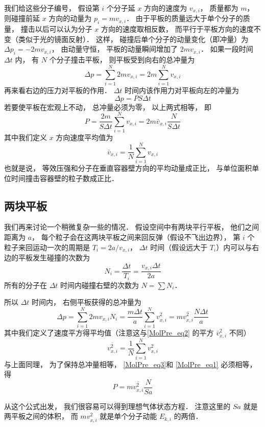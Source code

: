 我们给这些分子编号， 假设第 $i$ 个分子延 $x$ 方向的速度为 $v_{x,i}$， 质量都为 $m$， 则碰撞前延 $x$ 方向的动量为 $p_i = m v_{x,i}$． 由于平板的质量远大于单个分子的质量， 撞击以后可以认为分子 $x$ 方向的速度取相反数， 而平行于平板方向的速度不变（类似于光的镜面反射）． 这样， 碰撞后单个分子的动量变化（即冲量）为 $\Delta p_i = -2mv_{x,i}$， 由动量守恒， 平板的动量瞬间增加了 $2mv_{x,i}$． 如果一段时间 $\Delta t$ 内， 有 $N$ 个分子撞击平板， 则平板受到向右的总冲量为
\begin{equation}
\Delta p = \sum_{i=1}^N 2mv_{x,i} = 2m \sum_{i=1}^N v_{x,i}
\end{equation}
再来看右边的压力对平板的作用． $\Delta t$ 时间内该作用力对平板向左的冲量为
\begin{equation}\label{MolPre_eq1}
\Delta p = PS \Delta t
\end{equation}
若要使平板在宏观上不动， 总冲量必须为零， 以上两式相等， 即
\begin{equation}
P = \frac{2m}{S\Delta t} \sum_{i=1}^N v_{x,i} = 2m\bar v_{x,i} \frac{N}{S\Delta t}
\end{equation}
其中我们定义 $x$ 方向速度平均值为
\begin{equation}\label{MolPre_eq2}
\bar v_{x,i} = \frac{1}{N}\sum_{i=1}^N v_{x,i}
\end{equation}
也就是说， 等效压强和分子在垂直容器壁方向的平均动量成正比， 与单位面积单位时间撞击容器壁的粒子数成正比．

\subsection{两块平板}
我们再来讨论一个稍微复杂一些的情况． 假设空间中有两块平行平板， 他们之间距离为 $a$， 每个粒子会在这两块平板之间来回反弹（假设不飞出边界）， 第 $i$ 个粒子来回运动一次的周期是 $T_i = 2a/v_{x,i}$， $\Delta t$ 时间（假设远大于 $T_i$）内可以与右边的平板发生碰撞的次数为
\begin{equation}
N_i = \frac{\Delta t}{T_i} = \frac{v_{x,i} \Delta t}{2a}
\end{equation}
所有的分子在 $\Delta t$ 时间内碰撞右壁的次数为 $N = \sum N_i$．

所以 $\Delta t$ 时间内， 右侧平板获得的总冲量为
\begin{equation}\label{MolPre_eq3}
\Delta p = \sum_{i=1}^N 2mv_{x,i} N_i = \frac{m \Delta t}{a} \sum_{i=1}^N v_{x,i}^2 = m\overline {v_{x,i}^2} \frac{ N\Delta t}{a}
\end{equation}
其中我们定义了速度平方得平均值（注意这与\autoref{MolPre_eq2} 的平方 $\bar v_{x,i}^2$ 不同）
\begin{equation}
\overline {v_{x,i}^2} = \frac{1}{N} \sum_{i=1}^N v_{x,i}^2
\end{equation}
与上面同理， 为了保持总冲量相等， \autoref{MolPre_eq3}和 \autoref{MolPre_eq1} 必须相等， 得
\begin{equation}\label{MolPre_eq4}
P = m \overline {v_{x,i}^2} \frac{N}{Sa}
\end{equation}

从这个公式出发， 我们很容易可以得到理想气体状态方程． 注意这里的 $Sa$ 就是两平板之间的体积， 而 $mv_{x,i}^2$ 就是单个分子动能 $E_{k,i}$ 的两倍．

